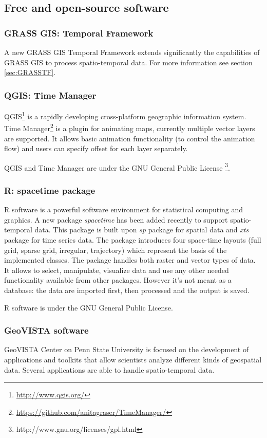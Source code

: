 \documentclass[a4paper,12pt,oneside]{book}
\begin{document}
\subsection{Free and open-source software}
\subsubsection{GRASS GIS: Temporal Framework}
A new GRASS GIS Temporal Framework extends significantly the capabilities of GRASS GIS
to process spatio-temporal data. For more information see section \ref{sec:GRASSTF}.

\subsubsection{QGIS: Time Manager}
QGIS\footnote{\url{http://www.qgis.org/}} is a rapidly developing cross-platform
geographic information system. Time Manager\footnote{\url{https://github.com/anitagraser/TimeManager/}}
is a plugin for animating maps, currently multiple vector layers are supported.
It allows basic animation functionality (to control the animation flow) and
users can specify offset for each layer separately.

QGIS and Time Manager are under the GNU General Public License%
\footnote{http://www.gnu.org/licenses/gpl.html}.

\subsubsection{R: spacetime package}
R software is a powerful software environment for statistical computing and graphics.
A new package \emph{spacetime} has been added recently \cite{PebesmaR} to support spatio-temporal data.
This package is built upon \emph{sp} package for spatial data and
\emph{xts} package for time series data.
The package introduces four space-time layouts (full grid, sparse grid, irregular, trajectory)
which represent the basis of the implemented classes.
The package handles both raster and vector types of data.
It allows to select, manipulate, visualize data and use any other needed functionality
available from other packages. However it's not meant as a database:
the data are imported first, then processed and the output is saved.

R software is under the GNU General Public License.

\subsubsection{GeoVISTA software}
GeoVISTA Center on Penn State University is focused on the development of applications
and toolkits that allow scientists analyze different kinds of geospatial data.
Several applications are able to handle spatio-temporal data.
\end{document}
